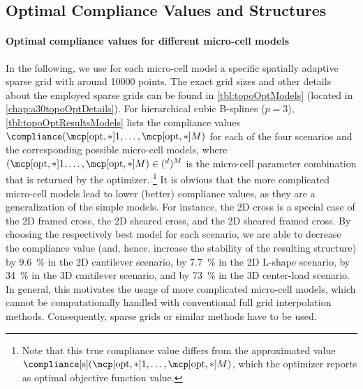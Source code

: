 \subsection{Optimal Compliance Values and Structures}
\label{sec:644optimization}

\paragraph{Optimal compliance values for different micro-cell models}

In the following, we use for each micro-cell model
a specific spatially adaptive sparse grid with around \num{10000} points.
The exact grid sizes and other details about the employed sparse grids
can be found in \cref{tbl:topoOptModels}
(located in \cref{chap:a30topoOptDetails}).
For hierarchical cubic B-splines ($p = 3$),
\cref{tbl:topoOptResultsModels} lists the
compliance values $\compliance(\mcpoptappr{1}, \dotsc, \mcpoptappr{M})$
for each of the four scenarios
and the corresponding possible micro-cell models,
where $(\mcpoptappr{1}, \dotsc, \mcpoptappr{M}) \in (\real^d)^M$
is the micro-cell parameter combination that is returned by the optimizer.%
\footnote{%
  Note that this true compliance value differs from the
  approximated value
  $\complianceintp(\mcpoptappr{1}, \dotsc, \mcpoptappr{M})$,
  which the optimizer reports as optimal objective function value.%
}
It is obvious that the more complicated micro-cell models
lead to lower (better) compliance values,
as they are a generalization of the simple models.
For instance, the 2D cross is a special case of
the 2D framed cross, the 2D sheared cross, and the 2D sheared framed cross.
By choosing the respectively best model for each scenario,
we are able to decrease the compliance value
(and, hence, increase the stability of the resulting structure)
by \SI{9.6}{\percent} in the 2D cantilever scenario,
by \SI{7.7}{\percent} in the 2D L-shape scenario,
by \SI{34}{\percent} in the 3D cantilever scenario, and
by \SI{73}{\percent} in the 3D center-load scenario.
In general, this motivates the usage of more complicated micro-cell models,
which cannot be computationally handled with
conventional full grid interpolation methods.
Consequently, sparse grids or similar methods have to be used.

